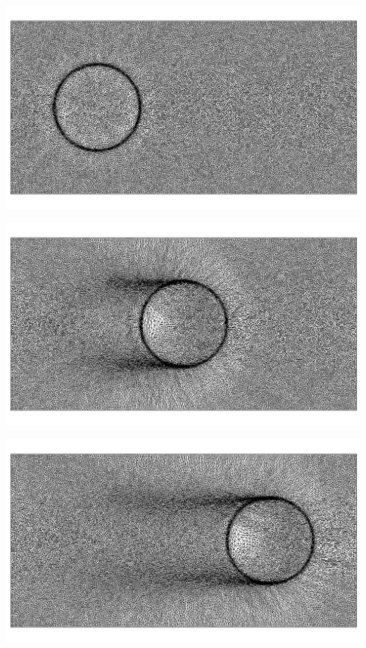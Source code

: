 \indent

\begingroup
	\begin{minipage}[t]{.5\linewidth}
		\centering
		 \includegraphics[scale=.15]{Bordeaux/figures/LSAdvection/CircleAdvNew0.png}
	\end{minipage}
	\begin{minipage}[t]{.5\linewidth}
		\centering
		 \includegraphics[scale=.15]{Bordeaux/figures/LSAdvection/CircleAdvNew10.png}
	\end{minipage}
	\begin{minipage}[t]{1.\linewidth}
		\centering
		 \includegraphics[scale=.15]{Bordeaux/figures/LSAdvection/CircleAdvNew20.png}
	\end{minipage}
\endgroup

